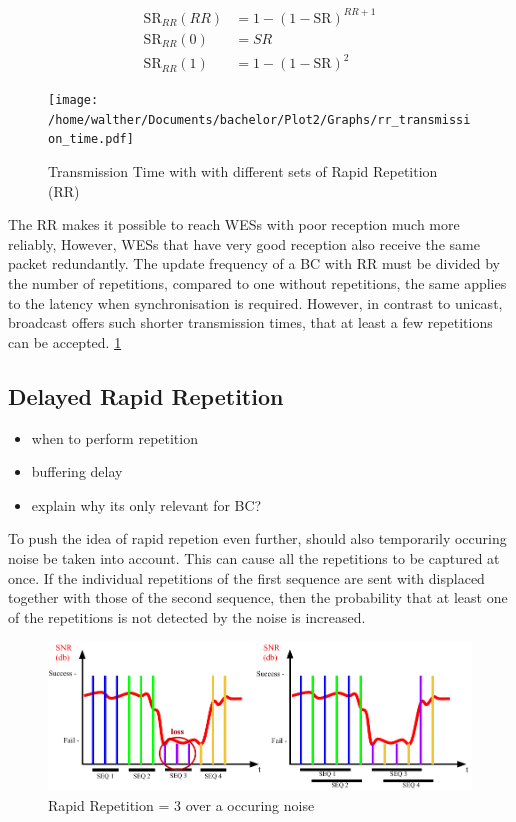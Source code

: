 \begin{align}
	\label{math:rr_sr}
	\text{SR}_{RR}(RR)	&= 1-(1-\text{SR})^{RR+1} \\
	\text{SR}_{RR}(0) 	&= SR \\
	\text{SR}_{RR}(1) 	&= 1-(1-\text{SR})^{2}
\end{align}

\begin{figure}[h]
	\centering
	\texttt{[image: /home/walther/Documents/bachelor/Plot2/Graphs/rr\_transmission\_time.pdf]}
	\caption{Transmission Time with with different sets of Rapid Repetition (RR)}
	\label{fig:rr_analytic}
\end{figure}

The RR makes it possible to reach WESs with poor reception much more reliably,
However, WESs that have very good reception also receive the same packet redundantly.
The update frequency of a BC with RR must be divided by the number of repetitions, compared to one without repetitions,
the same applies to the latency when synchronisation is required.
However, in contrast to unicast, broadcast offers such shorter transmission times,
that at least a few repetitions can be accepted. \cref{fig:rr_analytic}

\subsection{Delayed Rapid Repetition}
\label{sub:DelayedRepetition}
\begin{itemize}
\item when to perform repetition
\item buffering delay
\item explain why its only relevant for BC?
\end{itemize}

To push the idea of rapid repetion even further, should also temporarily occuring noise be taken into account.
This can cause all the repetitions to be captured at once.
If the individual repetitions of the first sequence are sent with displaced together with those of the second sequence,
then the probability that at least one of the repetitions is not detected by the noise is increased.

\begin{figure}[h]
	\includegraphics[scale=0.75]{figures/BadChannel.pdf}
	\caption{Rapid Repetition = 3 over a occuring noise}
	\label{fig:badChannel}
\end{figure}


